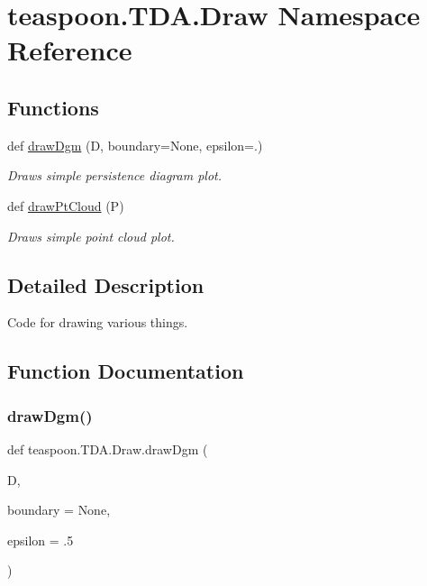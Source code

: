 \hypertarget{namespaceteaspoon_1_1_t_d_a_1_1_draw}{}\section{teaspoon.\+T\+D\+A.\+Draw Namespace Reference}
\label{namespaceteaspoon_1_1_t_d_a_1_1_draw}
\subsection*{Functions}
\begin{DoxyCompactItemize}
\item 
def \hyperlink{namespaceteaspoon_1_1_t_d_a_1_1_draw_a7d3fa76dab0dd537549437a5f6adfee2}{draw\+Dgm} (D, boundary=None, epsilon=.)
\begin{DoxyCompactList}\small\item\em Draws simple persistence diagram plot. \end{DoxyCompactList}\item 
def \hyperlink{namespaceteaspoon_1_1_t_d_a_1_1_draw_a204ad8c5e5fe84b51ab43fef94eb6645}{draw\+Pt\+Cloud} (P)
\begin{DoxyCompactList}\small\item\em Draws simple point cloud plot. \end{DoxyCompactList}\end{DoxyCompactItemize}


\subsection{Detailed Description}
\begin{DoxyVerb}Code for drawing various things.\end{DoxyVerb}
 

\subsection{Function Documentation}
\mbox{\label{namespaceteaspoon_1_1_t_d_a_1_1_draw_a7d3fa76dab0dd537549437a5f6adfee2}} 
\subsubsection{\texorpdfstring{draw\+Dgm()}{drawDgm()}}
{\footnotesize\ttfamily def teaspoon.\+T\+D\+A.\+Draw.\+draw\+Dgm (\begin{DoxyParamCaption}\item[{}]{D,  }\item[{}]{boundary = {\ttfamily None},  }\item[{}]{epsilon = {\ttfamily .5} }\end{DoxyParamCaption})}



